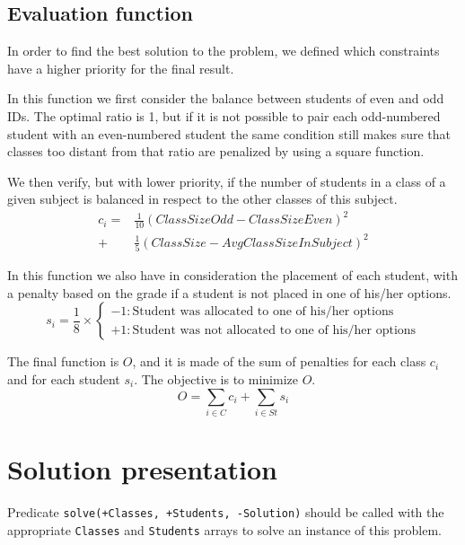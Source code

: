 \documentclass[runningheads]{llncs}
\begin{document}
\subsection{Evaluation function}

In order to find the best solution to the problem, we defined which constraints have a higher priority for the final result.

In this function we first consider the balance between students of even and odd IDs. The optimal ratio is 1, but if it is not possible to pair each odd-numbered student with an even-numbered student the same condition still makes sure that classes too distant from that ratio are penalized by using a square function. 

We then verify, but with lower priority, if the number of students in a class of a given subject is balanced in respect to the other classes of this subject.
\begin{equation}
\begin{aligned}
    c_i = & \frac{1}{10}\left(ClassSizeOdd - ClassSizeEven\right)^2 \\
        + & \frac{1}{5} \left(ClassSize - AvgClassSizeInSubject\right)^2
\end{aligned}
\end{equation}

In this function we also have in consideration the placement of each student, with a penalty based on the grade if a student is not placed in one of his/her options.
\begin{equation}
    s_i = \frac{1}{8} \times \begin{cases}
        -1 : \text{Student was allocated to one of his/her options} \\
        +1 : \text{Student was not allocated to one of his/her options}
    \end{cases}
\end{equation}

The final function is $O$, and it is made of the sum of penalties for each class $c_i$ and for each student $s_i$. The objective is to minimize $O$.
\begin{equation} 
    O = \sum_{i \in C}{c_i} + \sum_{i \in St}{s_i}
\end{equation}

\section{Solution presentation}

Predicate \texttt{solve(+Classes, +Students, -Solution)} should be called with the appropriate \texttt{Classes} and \texttt{Students} arrays to solve an instance of this problem.
\end{document}
